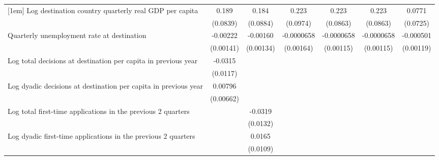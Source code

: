 \begin{table}[htbp]
\begin{tabular}{l*{6}{c}}
[1em]
Log destination country quarterly real GDP per capita&       0.189\sym{*}  &       0.184\sym{*}  &       0.223\sym{*}  &       0.223\sym{*}  &       0.223\sym{*}  &      0.0771         \\
                    &    (0.0839)         &    (0.0884)         &    (0.0974)         &    (0.0863)         &    (0.0863)         &    (0.0725)         \\
[1em]
Quarterly unemployment rate at destination&    -0.00222         &    -0.00160         &  -0.0000658         &  -0.0000658         &  -0.0000658         &   -0.000501         \\
                    &   (0.00141)         &   (0.00134)         &   (0.00164)         &   (0.00115)         &   (0.00115)         &   (0.00119)         \\
[1em]
Log total decisions at destination per capita in previous year&     -0.0315\sym{**} &                     &                     &                     &                     &                     \\
                    &    (0.0117)         &                     &                     &                     &                     &                     \\
[1em]
Log dyadic decisions at destination per capita in previous year&     0.00796         &                     &                     &                     &                     &                     \\
                    &   (0.00662)         &                     &                     &                     &                     &                     \\
[1em]
Log total first-time applications in the previous 2 quarters&                     &     -0.0319\sym{*}  &                     &                     &                     &                     \\
                    &                     &    (0.0132)         &                     &                     &                     &                     \\
[1em]
Log dyadic first-time applications in the previous 2 quarters&                     &      0.0165         &                     &                     &                     &                     \\
                    &                     &    (0.0109)         &                     &                     &                     &                     \\
[1em]

\end{tabular}
\end{table}
